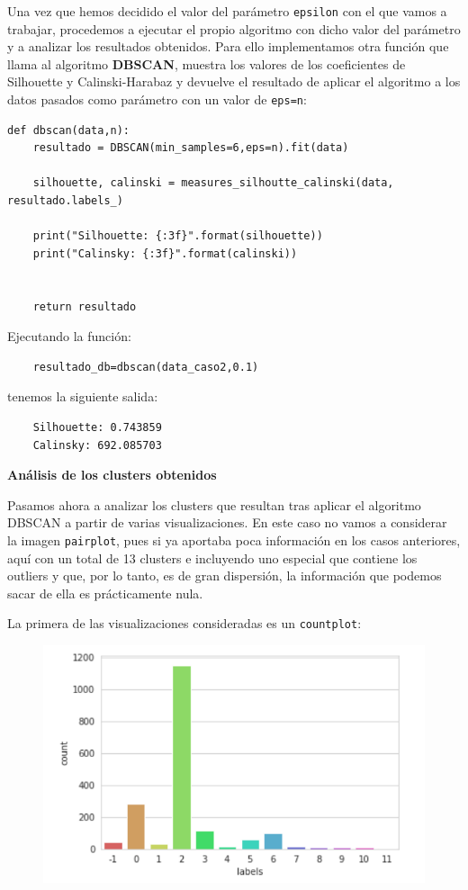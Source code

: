 \documentclass[a4paper,11pt]{book}
\begin{document}
Una vez que hemos decidido el valor del parámetro \texttt{epsilon} con el que vamos a trabajar, procedemos a ejecutar el propio algoritmo con dicho valor del parámetro y a analizar los resultados obtenidos. Para ello implementamos otra función que llama al algoritmo \textbf{DBSCAN}, muestra los valores de los coeficientes de Silhouette y Calinski-Harabaz y devuelve el resultado de aplicar el algoritmo a los datos pasados como parámetro con un valor de \texttt{eps=n}:
\begin{verbatim}
def dbscan(data,n):
	resultado = DBSCAN(min_samples=6,eps=n).fit(data)
	
	silhouette, calinski = measures_silhoutte_calinski(data, resultado.labels_)
	
	print("Silhouette: {:3f}".format(silhouette))
	print("Calinsky: {:3f}".format(calinski))
	
	
	return resultado
\end{verbatim}

Ejecutando la función:
\begin{verbatim}
	resultado_db=dbscan(data_caso2,0.1)
\end{verbatim}

tenemos la siguiente salida:

\begin{verbatim}
	Silhouette: 0.743859
	Calinsky: 692.085703
\end{verbatim}

\textbf{Análisis de los clusters obtenidos}

Pasamos ahora a analizar los clusters que resultan tras aplicar el algoritmo DBSCAN a partir de varias visualizaciones. En este caso no vamos a considerar la imagen \texttt{pairplot}, pues si ya aportaba poca información en los casos anteriores, aquí con un total de  13 clusters e incluyendo uno especial que contiene los outliers y que, por lo tanto, es de gran dispersión, la información que podemos sacar de ella es prácticamente nula. 

La primera de las visualizaciones consideradas es un \texttt{countplot}:
\begin{figure}[H]
	\centering
	\includegraphics[width=0.9\linewidth]{img/count5}
	\caption{}
	\label{fig:count5}
\end{figure}
\end{document}
